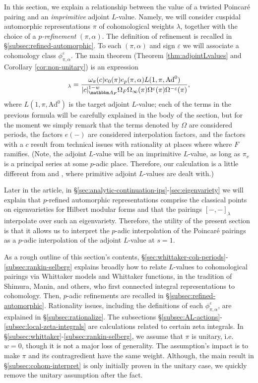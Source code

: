 \documentclass[10pt, twoside]{amsart}
\theoremstyle{plain}
\theoremstyle{definition}
\theoremstyle{remark}
\numberwithin{equation}{subsection}
\def\A{\mathbbm A}
\def\Ad{\mathrm{Ad}}
\begin{document}
In this section, we explain a relationship between the value of a twisted Poincar\'e pairing and an {\em imprimitive} adjoint $L$-value. Namely, we will consider cuspidal automorphic representations $\pi$ of cohomological weights $\lambda$, together with the choice of a {\em $p$-refinement} $(\pi,\alpha)$. The definition of refinement is recalled in \S\ref{subsec:refined-automorphic}. To each $(\pi,\alpha)$ and sign $\varepsilon$ we will associate a cohomology class $\phi_{\pi,\alpha}^{\varepsilon}$. The main theorem (Theorem \ref{thm:adjointLvalues} and Corollary \ref{cor:non-unitary}) is an expression
\begin{equation*}
[\phi_{\pi,\alpha}^{\varepsilon},\phi_{\pi,\alpha}^{-\varepsilon}]_{\lambda} = \frac{\omega_{\pi}(c)e_0(\pi)e_{p}(\pi,\alpha)L(1,\pi,\mathrm{Ad}^0)}{|c|_{\A_F}^{1-w}\Omega_F \Omega_\infty(\pi) \Omega^{\varepsilon}(\pi)\Omega^{-\varepsilon}(\pi)},
\end{equation*}
where $L(1,\pi,\Ad^0)$ is the target adjoint $L$-value; each of the terms in the previous formula will be carefully explained in the body of the section, but for the moment we simply remark that the terms denoted by $\Omega$ are considered  periods, the factors $e(-)$ are considered interpolation factors, and the factors with a $c$ result from technical issues with rationality at places where where $F$ ramifies.  (Note, the adjoint $L$-value will be an imprimitive $L$-value, as long as $\pi_v$ is a principal series at some $p$-adic place. Therefore, our calculation is a little different from \cite{Ghate} and \cite{Dimitrov}, where primitive adjoint $L$-values are dealt with.)

Later in the article, in \S \ref{sec:analytic-continuation-ips}-\ref{sec:eigenvariety} we will explain that $p$-refined automorphic representations comprise the classical points on eigenvarieties for Hilbert modular forms  and that the pairings $[-,-]_{\lambda}$ interpolate over such an eigenvariety. Therefore, the utility of the present section is that it allows us to interpret the $p$-adic interpolation of the Poincar\'e pairings as a $p$-adic interpolation of the adjoint $L$-value at $s=1$.

As a rough outline of this section's contents, \S\ref{sec:whittaker-coh-periods}-\ref{subsec:rankin-selberg} explains broadly how to relate $L$-values to cohomological pairings via Whittaker models and Whittaker functions, in the tradition of Shimura, Manin, and others, who first connected integral representations to cohomology. Then, $p$-adic refinements are recalled in \S \ref{subsec:refined-automorphic}. Rationality issues, including the definitions of each $\phi_{\pi,\alpha}^{\varepsilon}$, are explained in \S \ref{subsec:rationalize}. The subsections \S \ref{subsec:AL-actions}-\ref{subsec:local-zeta-integrals} are calculations related to certain zeta integrals. In \S \ref{subsec:whittaker}-\ref{subsec:rankin-selberg}, we assume that $\pi$ is unitary, i.e.\ $w = 0$, though it is not a major loss of generality. The assumption's impact is to make $\pi$ and its contragredient have the same weight. Although, the main result in  \S\ref{subsec:cohom-interpret} is only initially proven in the unitary case, we quickly remove the unitary assumption after the fact.
\end{document}
